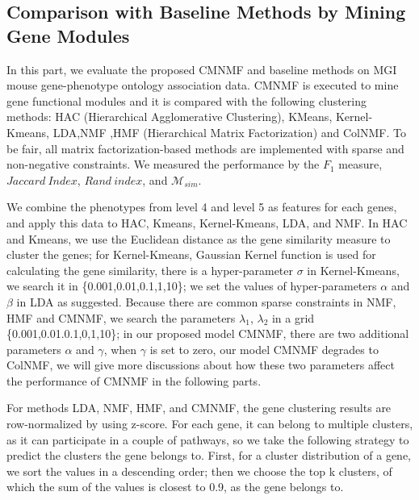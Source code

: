\documentclass{bmcart}
\begin{document}

\subsection*{\textbf{Comparison with Baseline Methods by Mining Gene Modules}}
In this part, we evaluate the proposed CMNMF and baseline methods on MGI mouse gene-phenotype ontology association data.
CMNMF is executed to mine gene functional modules and it is compared with the following clustering methods: HAC (Hierarchical Agglomerative Clustering)\cite{Ward1963}, KMeans, Kernel-Kmeans\cite{Dhillon2004}, LDA\cite{Blei2003},NMF\cite{Mika1999} ,HMF (Hierarchical Matrix Factorization) \cite{AliMashhoori2012} and ColNMF\cite{Singh2008}. To be fair, all matrix factorization-based methods are implemented with sparse and non-negative constraints. We measured the performance by the $F_1$ measure, $Jaccard\ Index$, $Rand\ index$, and $\mathcal{M}_{sim}$.

We combine the phenotypes from level 4 and level 5 as features for each genes, and apply this data to HAC, Kmeans, Kernel-Kmeans, LDA, and NMF. In HAC and Kmeans, we use the Euclidean distance as the gene similarity measure to cluster the genes; for Kernel-Kmeans, Gaussian Kernel function is used for calculating the gene similarity, there is a hyper-parameter $\sigma$ in Kernel-Kmeans, we search it in \{0.001,0.01,0.1,1,10\}; we set the values of hyper-parameters $\alpha$ and $\beta$ in LDA as \cite{Wei2006} suggested. Because there are common sparse constraints in NMF, HMF and CMNMF, we search the parameters $\lambda_1$, $\lambda_2$ in a grid \{0.001,0.01.0.1,0,1,10\}; in our proposed model CMNMF, there are two additional parameters $\alpha$ and $\gamma$, when $\gamma$ is set to zero, our model CMNMF degrades to ColNMF, we will give more discussions about how these two parameters affect the performance of CMNMF in the following parts.

For methods LDA, NMF, HMF, and CMNMF, the gene clustering results are row-normalized by using z-score. For each gene, it can belong to multiple clusters, as it can participate in a couple of pathways, so we take the following strategy to predict the clusters the gene belongs to. First, for a cluster distribution of a gene, we sort the values in a descending order; then we choose the top k clusters, of which the sum of the values is closest to 0.9, as the gene belongs to.
\end{document}
